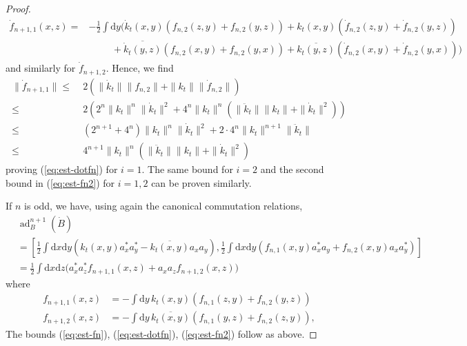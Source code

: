 \documentclass[11pt,a4paper,DIV11]{scrartcl}	%
\newcommand{\ad}{\operatorname{ad}}	%
\newcommand{\di}{\textrm{d}}		%
\newcommand{\cc}[1]{\overline{#1}}	%
\begin{document}
\begin{proof}
\[\begin{split}
\dot{f}_{n+1,1}(x,z) = &-\frac{1}{2} \int \di y \Big( \dot{k}_t (x,y) \left( f_{n,2}(z,y) + f_{n,2}(y,z) \right) + k_t (x,y) \left( \dot{f}_{n,2} (z,y) + \dot{f}_{n,2} (y,z) \right) \\ &\hspace{1cm} + \cc{\dot{k}_t (y,z)} \left( f_{n,2}(x,y) + f_{n,2}(y,x)\right) + \cc{k_t (y,z)} \left( \dot{f}_{n,2}(x,y) + \dot{f}_{n,2}(y,x)\right) \Big) \end{split}\]
and similarly for $\dot{f}_{n+1,2}$. Hence, we find
\[ \begin{split} 
\| \dot{f}_{n+1,1} \| \leq \; &2 \left( \| \dot{k}_t \| \| f_{n,2} \| + \| k_t \| \| \dot{f}_{n,2} \| \right)  \\
\leq \; & 2 \left( 2^n \| k_t \|^n \| \dot{k}_t \|^2 + 4^n \| k_t \|^n \left( \| \ddot k_t \| \| k_t \| + \| \dot k_t \|^2 \right) \right) \\
\leq \; & (2^{n+1} + 4^n) \| k_t \|^n \| \dot k_t \|^2 + 2 \cdot 4^n \| k_t \|^{n+1} \| \ddot k_t \| \\ \leq \; & 4^{n+1} \| k_t \|^n \left( \| \ddot k_t \| \| k_t \| + \| \dot k_t \|^2 \right)
\end{split} \]
proving (\ref{eq:est-dotfn}) for $i = 1$. The same bound for $i=2$ and the second bound in (\ref{eq:est-fn2}) for $i=1,2$ can be proven similarly. 

If $n$ is odd, we have, using again the canonical commutation relations, 
\begin{align*}
& \ad^{n+1}_B(\dot B)\\
& = \left[ \frac{1}{2}\int \di x \di y \left( k_t (x,y)a^\ast_x a^\ast_y - \cc{k_t (x,y)} a_x a_y \right) , \frac{1}{2}\int \di x\di y \left( f_{n,1}(x,y) a^\ast_x a_y + f_{n,2}(x,y) a_x a^\ast_y \right) \right] \\
& = \frac{1}{2} \int \di x\di z \big( a^\ast_x a^\ast_z f_{n+1,1}(x,z) + a_x a_z f_{n+1,2}(x,z) \big)
\end{align*}
where
\begin{equation}
\label{eq:odd}
\begin{split}
f_{n+1,1}(x,z) & = - \int \di y\, k_t (x,y)\left( f_{n,1}(z,y) + f_{n,2}(y,z) \right) \\
f_{n+1,2}(x,z) & = - \int \di y\, \cc{k_t (x,y)}\left( f_{n,1}(y,z) + f_{n,2}(z,y) \right),
\end{split}
\end{equation}
The bounds (\ref{eq:est-fn}), (\ref{eq:est-dotfn}), (\ref{eq:est-fn2}) follow as above.
\end{proof}
\end{document}
